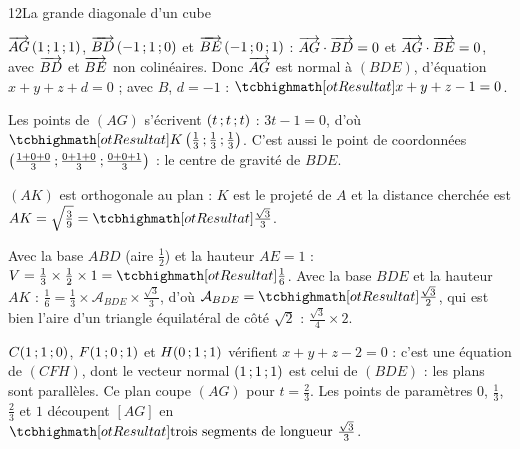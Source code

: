 \begin{corrige}{12}{La grande diagonale d'un cube}
\begin{questions}
  \item $\overrightarrow{AG}\,(1\,{;}\,1\,{;}\,1)$, $\overrightarrow{BD}\,(-1\,{;}\,1\,{;}\,0)$ et $\overrightarrow{BE}\,(-1\,{;}\,0\,{;}\,1)$ : $\overrightarrow{AG}\cdot\overrightarrow{BD}=0$ et
    $\overrightarrow{AG}\cdot\overrightarrow{BE}=0$, avec $\overrightarrow{BD}$ et $\overrightarrow{BE}$ non colinéaires. Donc $\overrightarrow{AG}$ est normal à $(BDE)$, d'équation
    $x+y+z+d=0$ ; avec $B$, $d=-1$ : $\res{x+y+z-1=0}$.
  \item Les points de $(AG)$ s'écrivent $(t\,{;}\, t\,{;}\, t)$ : $3t-1=0$, d'où $\res{K\left(\tfrac13\pv\tfrac13\pv\tfrac13\right)}$. C'est
    aussi le point de coordonnées $\left(\frac{1+0+0}{3}\,{;}\,\frac{0+1+0}{3}\,{;}\,\frac{0+0+1}{3}\right)$ : le centre de gravité de $BDE$.
  \item $(AK)$ est orthogonale au plan : $K$ est le projeté de $A$ et la distance cherchée est $AK=\sqrt{\frac39}=\res{\tfrac{\sqrt3}{3}}$.
  \item Avec la base $ABD$ (aire $\frac12$) et la hauteur $AE=1$ : $V=\frac13\times\frac12\times1=\res{\tfrac16}$. Avec la base $BDE$ et la
    hauteur $AK$ : $\frac16=\frac13\times\mathcal{A}_{BDE}\times\frac{\sqrt3}{3}$, d'où $\mathcal{A}_{BDE}=\res{\tfrac{\sqrt3}{2}}$, qui est
    bien l'aire d'un triangle équilatéral de côté $\sqrt2$ : $\frac{\sqrt3}{4}\times2$.
  \item $C(1\,{;}\,1\,{;}\,0)$, $F(1\,{;}\,0\,{;}\,1)$ et $H(0\,{;}\,1\,{;}\,1)$ vérifient $x+y+z-2=0$ : c'est une équation de $(CFH)$, dont le vecteur normal
    $(1\,{;}\,1\,{;}\,1)$ est celui de $(BDE)$ : les plans sont parallèles. Ce plan coupe $(AG)$ pour $t=\frac23$. Les points de paramètres
    $0$, $\frac13$, $\frac23$ et $1$ découpent $[AG]$ en $\res{\text{trois segments de longueur }\tfrac{\sqrt3}{3}}$.
\end{questions}
\end{corrige}
